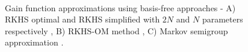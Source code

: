 \begin{figure}[htbp]
	\centering
	\mbox{
		\label{fig:A}
	}
	\mbox{
	}
	\mbox{
	} 
	\caption[RKHS and coifman performance]{Gain function approximations using basis-free approaches - A) RKHS optimal and RKHS simplified with $2N$ and $N$ parameters respectively \cite{radmey18a}, B) RKHS-OM method \cite{radmey19}, C) Markov semigroup approximation \cite{tagmeh16}.}
	\label{fig:diff_td_rkhs_coif}
\end{figure}
